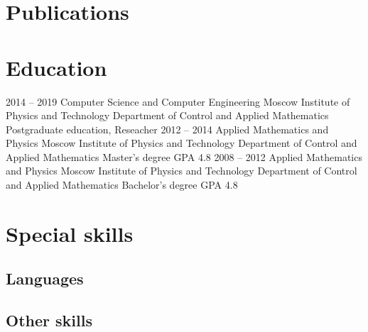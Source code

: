 \documentclass[11pt,a4paper]{moderncv}
\begin{document}
\section{Publications}

\newpage

\section{Education}
  \cventry
    {2014 -- 2019}
    {Computer Science and Computer Engineering}
    {Moscow Institute of Physics and Technology}
    {Department of Control and Applied Mathematics}
    {Postgraduate education, Reseacher}{}
  \cventry
    {2012 -- 2014}
    {Applied Mathematics and Physics}
    {Moscow Institute of Physics and Technology}
    {Department of Control and Applied Mathematics}
    {Master's degree}
    {GPA 4.8}
  \cventry
    {2008 -- 2012}
    {Applied Mathematics and Physics}
    {Moscow Institute of Physics and Technology}
    {Department of Control and Applied Mathematics}
    {Bachelor's degree}
    {GPA 4.8}

\section{Special skills}
\subsection{Languages}
\subsection{Other skills}
\end{document}
